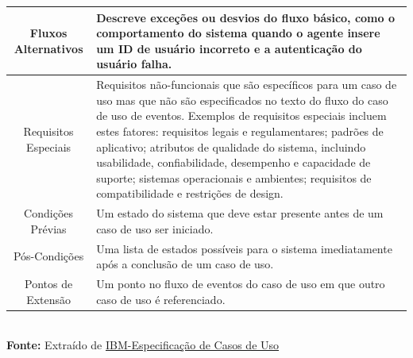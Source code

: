 \begin{table}[!htbp]
\begin{tabular}{ c | p{11.5cm} }
    Fluxos Alternativos  & Descreve exceções ou desvios do fluxo básico, como o comportamento do sistema quando o agente insere um ID de usuário incorreto e a autenticação do usuário falha.                                                                                                                                                                                                                                                                                                                                            \\ \hline
    Requisitos Especiais & Requisitos não-funcionais que são específicos para um caso de uso mas que não são especificados no texto do fluxo do caso de uso de eventos. Exemplos de requisitos especiais incluem estes fatores: requisitos legais e regulamentares; padrões de aplicativo; atributos de qualidade do sistema, incluindo usabilidade, confiabilidade, desempenho e capacidade de suporte; sistemas operacionais e ambientes; requisitos de compatibilidade e restrições de design.                                        \\ \hline
    Condições Prévias    & Um estado do sistema que deve estar presente antes de um caso de uso ser iniciado.                                                                                                                                                                                                                                                                                                                                                                                                                            \\ \hline
    Pós-Condições        & Uma lista de estados possíveis para o sistema imediatamente após a conclusão de um caso de uso.                                                                                                                                                                                                                                                                                                                                                                                                               \\ \hline
    Pontos de Extensão   & Um ponto no fluxo de eventos do caso de uso em que outro caso de uso é referenciado.                                                                                                                                                                                                                                                                                                                                                                                                                          \\ \hline
  \end{tabular}
  \\ \vspace{0.2cm}
  \textbf{Fonte:} Extraído de \href{https://www.ibm.com/docs/pt-br/elm/6.0?topic=cases-use-case-specification-outline}{IBM-Especificação de Casos de Uso}
  \label{tab:especCasosDeUso}
\end{table}
\FloatBarrier

